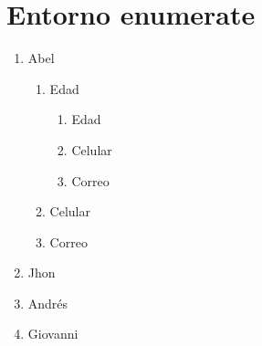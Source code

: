\documentclass[11pt,a4paper]{article}
\begin{document}
\section{Entorno enumerate}

\begin{enumerate}
\item Abel
\begin{enumerate}
\item Edad
\begin{enumerate}
\item Edad
\item Celular
\item Correo
\end{enumerate}
\item Celular
\item Correo
\end{enumerate}
\item Jhon
\item Andrés
\item Giovanni
\end{enumerate}
\end{document}
